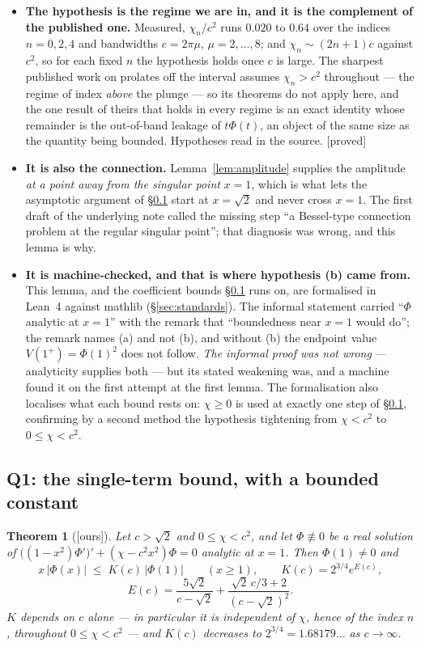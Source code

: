 \documentclass[11pt,a4paper]{article}
\theoremstyle{plain}
\newtheorem{theorem}{Theorem}[section]
\theoremstyle{definition}
\theoremstyle{remark}
\newcommand{\st}[1]{{\normalfont\sffamily\footnotesize[#1]}}
\newcommand{\proved}{\st{proved}}
\newcommand{\ours}{{\normalfont\sffamily\footnotesize[ours]}}
\begin{document}
\begin{itemize}\itemsep2pt
\item \textbf{The hypothesis is the regime we are in, and it is the complement
of the published one.}  Measured, $\chi_n/c^2$ runs $0.020$ to $0.64$ over the
indices $n=0,2,4$ and bandwidths $c=2\pi\mu$, $\mu=2,\dots,8$; and
$\chi_n\sim(2n+1)c$ against $c^2$, so for each fixed $n$ the hypothesis holds
once $c$ is large.  The sharpest published work on prolates off the interval
\cite{OsipovRokhlin2013} assumes $\chi_n>c^2$ throughout --- the
regime of index \emph{above} the plunge --- so its theorems do not apply here,
and the one result of theirs that holds in every regime is an exact identity
whose remainder is the out-of-band leakage of $t\Phi(t)$, an object of the same
size as the quantity being bounded.  Hypotheses read in the source. \proved
\item \textbf{It is also the connection.}  Lemma~\ref{lem:amplitude} supplies
the amplitude \emph{at a point away from the singular point} $x=1$, which is
what lets the asymptotic argument of \S\ref{sec:q1} start at $x=\sqrt2$ and
never cross $x=1$.  The first draft of the underlying note called the missing
step ``a Bessel-type connection problem at the regular singular point''; that
diagnosis was wrong, and this lemma is why.
\item \textbf{It is machine-checked, and that is where hypothesis (b) came
from.}  This lemma, and the coefficient bounds \S\ref{sec:q1} runs on, are
formalised in Lean~4 against mathlib (\S\ref{sec:standards}).  The informal
statement carried ``$\Phi$ analytic at $x=1$'' with the remark that
``boundedness near $x=1$ would do''; the remark names (a) and not (b), and
without (b) the endpoint value $V(1^+)=\Phi(1)^2$ does not follow.  \emph{The
informal proof was not wrong} --- analyticity supplies both --- but its stated
weakening was, and a machine found it on the first attempt at the first
lemma.  The formalisation also localises what each bound rests on: $\chi\ge0$
is used at exactly one step of \S\ref{sec:q1}, confirming by a second method
the hypothesis tightening from $\chi<c^2$ to $0\le\chi<c^2$.
\end{itemize}

\subsection{Q1: the single-term bound, with a bounded constant}
\label{sec:q1}

\begin{theorem}[\ours]\label{thm:q1}
Let $c>\sqrt2$ and $0\le\chi<c^2$, and let $\Phi\not\equiv0$ be a real solution
of $\big((1-x^2)\Phi'\big)'+(\chi-c^2x^2)\Phi=0$ analytic at $x=1$.  Then
$\Phi(1)\ne0$ and
\[
  x\,|\Phi(x)|\;\le\;K(c)\,|\Phi(1)|\qquad(x\ge1),\qquad
  K(c)=2^{3/4}e^{E(c)},
\]
\[
  E(c)=\frac{5\sqrt2}{c-\sqrt2}+\frac{\sqrt2\,c/3+2}{(c-\sqrt2)^2}.
\]
$K$ depends on $c$ alone --- in particular it is \emph{independent of $\chi$,
hence of the index $n$}, throughout $0\le\chi<c^2$ --- and $K(c)$ decreases to
$2^{3/4}=1.68179\ldots$ as $c\to\infty$.
\end{theorem}
\end{document}
